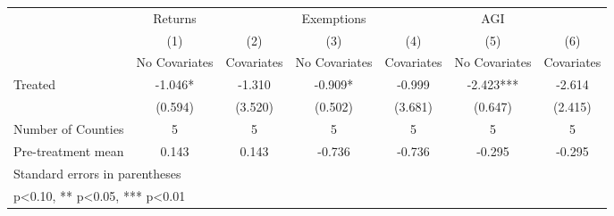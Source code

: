 {
\def\sym#1{\ifmmode^{#1}\else\(^{#1}\)\fi}
\begin{tabular}{l*{6}{c}}
\hline\hline
            &     Returns   &               &  Exemptions   &               &         AGI   &               \\
            &\multicolumn{1}{c}{(1)}&\multicolumn{1}{c}{(2)}&\multicolumn{1}{c}{(3)}&\multicolumn{1}{c}{(4)}&\multicolumn{1}{c}{(5)}&\multicolumn{1}{c}{(6)}\\
            &\multicolumn{1}{c}{No Covariates}&\multicolumn{1}{c}{Covariates}&\multicolumn{1}{c}{No Covariates}&\multicolumn{1}{c}{Covariates}&\multicolumn{1}{c}{No Covariates}&\multicolumn{1}{c}{Covariates}\\
\hline
Treated     &      -1.046*  &      -1.310   &      -0.909*  &      -0.999   &      -2.423***&      -2.614   \\
            &     (0.594)   &     (3.520)   &     (0.502)   &     (3.681)   &     (0.647)   &     (2.415)   \\
\hline
Number of Counties&           5   &           5   &           5   &           5   &           5   &           5   \\
Pre-treatment mean&       0.143   &       0.143   &      -0.736   &      -0.736   &      -0.295   &      -0.295   \\
\hline\hline
\multicolumn{7}{l}{\footnotesize Standard errors in parentheses}\\
\multicolumn{7}{l}{\footnotesize * p<0.10, ** p<0.05, *** p<0.01}\\
\end{tabular}
}
